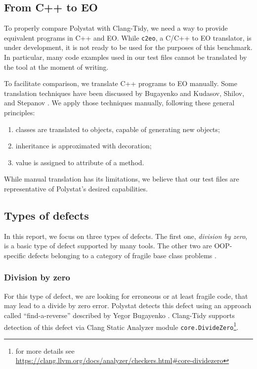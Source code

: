 \subsection{From C++ to EO}

To properly compare Polystat with Clang-Tidy, we need a way to provide equivalent programs in C++ and EO. While \texttt{c2eo}, a C/C++ to EO translator, is under development, it is not ready to be used for the purposes of this benchmark. In particular, many code examples used in our test files cannot be translated by the tool at the moment of writing.

To facilitate comparison, we translate C++ programs to EO manually. Some translation techniques have been discussed by Bugayenko \cite{bugayenko2021reducing} and Kudasov, Shilov, and Stepanov \cite[Section 2]{KudasovShilovStepanov2021}. We apply those techniques manually, following these general principles:
\begin{enumerate}
    \item classes are translated to objects, capable of generating new objects;
    \item inheritance is approximated with decoration;
    \item {} value is assigned to  attribute of a method.
\end{enumerate}

While manual translation has its limitations, we believe that our test files are representative of Polystat's desired capabilities.

\subsection{Types of defects}

In this report, we focus on three types of defects. The first one, \emph{division by zero}, is a basic type of defect supported by many tools. The other two are OOP-specific defects belonging to a category of fragile base class problems \cite{MikhajlovSekerinski1998}.

\subsubsection{Division by zero}

For this type of defect, we are looking for erroneous or at least fragile code, that may lead to a divide by zero error. Polystat detects this defect using an approach called ``find-a-reverse'' described by Yegor Bugayenko \cite{eolang-far}.
Clang-Tidy supports detection of this defect via Clang Static Analyzer module \texttt{core.DivideZero}\footnote{for more details see \url{https://clang.llvm.org/docs/analyzer/checkers.html\#core-dividezero}}.

